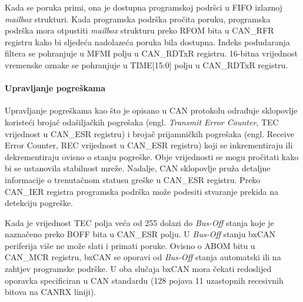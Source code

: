 Kada se poruka primi, ona je dostupna programskoj podršci u FIFO izlaznoj \textit{mailbox} strukturi. Kada programska podrška pročita poruku, programska podrška mora otpustiti \textit{mailbox} strukturu preko RFOM bita u CAN\_RFR registru kako bi sljedeća nadolazeća poruka bila dostupna. Indeks podudaranja filtera se pohranjuje u MFMI polju u CAN\_RDTxR registru. 16-bitna vrijednost vremenske oznake se pohranjuje u TIME[15:0] polju u CAN\_RDTxR registru.

\paragraph{Upravljanje pogreškama}

Upravljanje pogreškama kao što je opisano u CAN protokolu odrađuje sklopovlje koristeći brojač odašiljačkih pogrešaka (engl. \textit{Transmit Error Counter}, TEC vrijednost u CAN\_ESR registru) i brojač prijamničkih pogrešaka (engl. Receive Error Counter, REC vrijednost u CAN\_ESR registru) koji se inkrementiraju ili dekrementiraju ovisno o stanju pogreške. Obje vrijednosti se mogu pročitati kako bi se ustanovila stabilnost mreže. Nadalje, CAN sklopovlje pruža detaljne informacije o trenutačnom statusu greške u CAN\_ESR registru. Preko CAN\_IER registra programska podrška može podesiti stvaranje prekida na detekciju pogreške.

Kada je vrijednost TEC polja veća od 255 dolazi do \textit{Bus-Off} stanja koje je naznačeno preko BOFF bita u CAN\_ESR polju. U \textit{Bus-Off} stanju bxCAN periferija više ne može slati i primati poruke. Ovisno o ABOM bitu u CAN\_MCR registru, bxCAN se oporavi od \textit{Bus-Off} stanja automatski ili na zahtjev programske podrške. U oba slučaja bxCAN mora čekati redoslijed oporavka specificiran u CAN standardu (128 pojava 11 uzastopnih recesivnih bitova na CANRX liniji).

